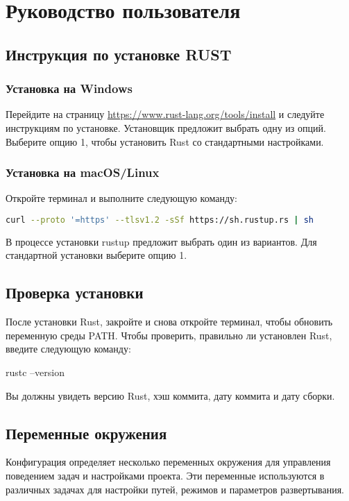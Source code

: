 \section{Руководство пользователя}

\subsection{ Инструкция по установке RUST }
\subsubsection{ Установка на Windows }
	Перейдите на страницу \url{https://www.rust-lang.org/tools/install} и следуйте инструкциям по установке.
    Установщик предложит выбрать одну из опций. Выберите опцию 1, чтобы установить Rust со стандартными настройками.

\subsubsection{Установка на macOS/Linux}
Откройте терминал и выполните следующую команду:

\begin{lstlisting}[language=bash]
curl --proto '=https' --tlsv1.2 -sSf https://sh.rustup.rs | sh
\end{lstlisting}


В процессе установки rustup предложит выбрать один из вариантов. Для стандартной установки выберите опцию 1.

\subsection{Проверка установки}
	После установки Rust, закройте и снова откройте терминал, чтобы обновить переменную среды PATH.
	Чтобы проверить, правильно ли установлен Rust, введите следующую команду:
\begin{lstinline}[language=bash]
rustc --version
\end{lstinline}


Вы должны увидеть версию Rust, хэш коммита, дату коммита и дату сборки.

\subsection{Переменные окружения}

Конфигурация определяет несколько переменных окружения для управления поведением задач и настройками проекта. Эти переменные используются в различных задачах для настройки путей, режимов и параметров развертывания.

